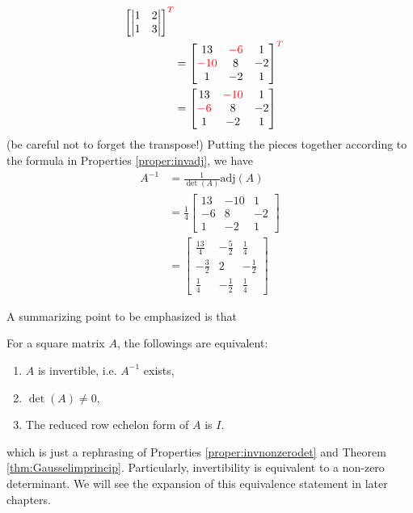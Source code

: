 \begin{solution}
\begin{align*}
\begin{bmatrix}
\begin{vmatrix}
1 & 2 \\
1 & 3 
\end{vmatrix} 
\end{bmatrix}^{\color{red}{T}} \\
&= 
\begin{bmatrix}
13 & \textcolor{red}{-6} & 1 \\
\textcolor{red}{-10} & 8 & -2 \\
1 & -2 & 1
\end{bmatrix}^{\color{red}{T}} \\
&= 
\begin{bmatrix}
13 & \textcolor{red}{-10} & 1 \\
\textcolor{red}{-6} & 8 & -2 \\
1 & -2 & 1
\end{bmatrix}
\end{align*}
(be careful not to forget the transpose!) Putting the pieces together according to the formula in Properties \ref{proper:invadj}, we have
\begin{align*}
A^{-1} &= \frac{1}{\det(A)}\text{adj}(A) \\
&= \frac{1}{4}
\begin{bmatrix}
13 & -10 & 1 \\
-6 & 8 & -2 \\
1 & -2 & 1
\end{bmatrix} \\
&= 
\begin{bmatrix}
\frac{13}{4} & -\frac{5}{2} & \frac{1}{4} \\
-\frac{3}{2} & 2 & -\frac{1}{2} \\
\frac{1}{4} & -\frac{1}{2} & \frac{1}{4}
\end{bmatrix}
\end{align*}
\end{solution}
A summarizing point to be emphasized is that
\begin{thm}
\label{thm:equiv1}
For a square matrix $A$, the followings are equivalent:
\begin{enumerate}[label=(\alph*)]
\item $A$ is invertible, i.e. $A^{-1}$ exists,
\item $\det(A) \neq 0$,
\item The reduced row echelon form of $A$ is $I$.
\end{enumerate}
\end{thm}
which is just a rephrasing of Properties \ref{proper:invnonzerodet} and Theorem \ref{thm:Gausselimprincip}. 
Particularly, invertibility is equivalent to a non-zero determinant. We will see the expansion of this equivalence statement in later chapters.

